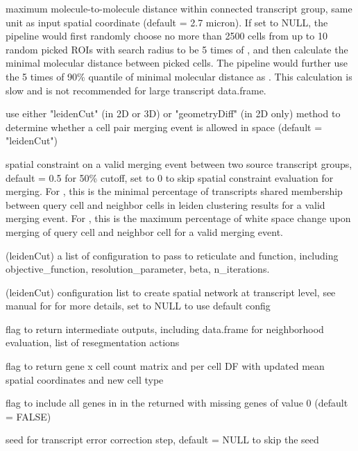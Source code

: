 \documentclass[letterpaper]{book}
\begin{document}
\begin{Arguments}
\begin{ldescription}
\item[\code{distance\_cutoff}] maximum molecule-to-molecule distance within connected transcript group, same unit as input spatial coordinate (default = 2.7 micron).
If set to NULL, the pipeline would first randomly choose no more than 2500 cells from up to 10 random picked ROIs with search radius to be 5 times of , and then calculate the minimal molecular distance between picked cells. The pipeline would further use the 5 times of 90\% quantile of minimal molecular distance as . This calculation is slow and is not recommended for large transcript data.frame.

\item[\code{spatialMergeCheck\_method}] use either "leidenCut" (in 2D or 3D) or "geometryDiff" (in 2D only) method to determine whether a cell pair merging event is allowed in space (default = "leidenCut")

\item[\code{cutoff\_spatialMerge}] spatial constraint on a valid merging event between two source transcript groups, default = 0.5 for 50\% cutoff, set to 0 to skip spatial constraint evaluation for merging.
For , this is the minimal percentage of transcripts shared membership between query cell and neighbor cells in leiden clustering results for a valid merging event.
For , this is the maximum percentage of white space change upon merging of query cell and neighbor cell for a valid merging event.

\item[\code{leiden\_config}] (leidenCut) a list of configuration to pass to reticulate and  function, including objective\_function, resolution\_parameter, beta, n\_iterations.

\item[\code{config\_spatNW\_transcript}] (leidenCut) configuration list to create spatial network at transcript level, see manual for  for more details, set to NULL to use default config

\item[\code{return\_intermediates}] flag to return intermediate outputs, including  data.frame for neighborhood evaluation,  list of resegmentation actions

\item[\code{return\_perCellData}] flag to return gene x cell count matrix and per cell DF with updated mean spatial coordinates and new cell type

\item[\code{includeAllRefGenes}] flag to include all genes in  in the returned  with missing genes of value 0 (default = FALSE)

\item[\code{seed\_segRefine}] seed for transcript error correction step, default = NULL to skip the seed
\end{ldescription}
\end{Arguments}
\end{document}
